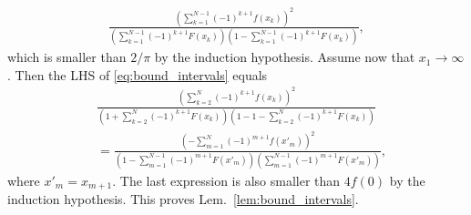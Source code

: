 \documentclass[letterpaper, conference]{IEEEtran}      %
\begin{document}
\begin{align*}
\frac{ \left(  \sum_{k=1}^{N-1} (-1)^{k+1}f(x_k) \right)^2} 
{\left( \sum_{k=1}^{N-1} (-1)^{k+1} F(x_k) \right)\left(1- \sum_{k=1}^{N-1} (-1)^{k+1} F(x_k)  \right) } ,
\end{align*}
which is smaller than $2/\pi$ by the induction hypothesis. Assume now that $x_1 \rightarrow \infty$. Then the LHS of
\eqref{eq:bound_intervals} equals
\begin{align*}
& \frac{ \left(  \sum_{k=2}^{N} (-1)^{k+1}f(x_k) \right)^2} 
{\left( 1 + \sum_{k=2}^{N} (-1)^{k+1} F(x_k) \right)\left(1- 1 - \sum_{k=2}^{N} (-1)^{k+1} F(x_k)  \right) }  \\
& = \frac{ \left(  -\sum_{m=1}^{N} (-1)^{m+1}f(x'_m) \right)^2} 
{\left( 1 - \sum_{m=1}^{N-1} (-1)^{m+1} F(x'_{m}) \right)\left( \sum_{m=1}^{N-1} (-1)^{m+1} F(x'_{m})  \right) },
\end{align*}
where $x'_{m} = x_{m+1}$. The last expression is also smaller than $4f(0)$ by the induction hypothesis. This proves Lem.~\ref{lem:bound_intervals}. \\
\end{document}
